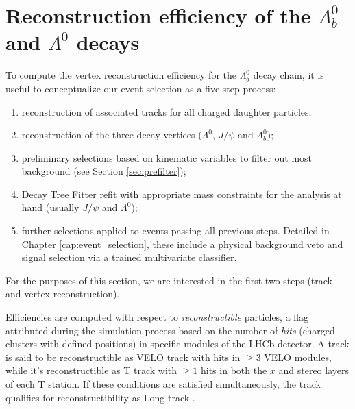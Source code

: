 
\section{Reconstruction efficiency of the \texorpdfstring{$\Lambda^0_b$}{Lambdab} and \texorpdfstring{$\Lambda^0$}{Lambda} decays}

To compute the vertex reconstruction efficiency for the $\Lambda_b^0$ decay chain, it is useful to conceptualize our event selection as a five step process:
\begin{enumerate}
	\item reconstruction of associated tracks for all charged daughter particles;
	\item reconstruction of the three decay vertices ($\Lambda^0$, $J/\psi$ and $\Lambda_b^0$);
	\item preliminary selections based on kinematic variables to filter out most background (see Section \ref{sec:prefilter});
	\item Decay Tree Fitter refit with appropriate mass constraints for the analysis at hand (usually $J/\psi$ and $\Lambda^0$);
	\item further selections applied to events passing all previous steps. Detailed in Chapter \ref{cap:event_selection}, these include a physical background veto and signal selection via a trained multivariate classifier.
\end{enumerate}

For the purposes of this section, we are interested in the first two steps (track and vertex reconstruction).

Efficiencies are computed with respect to \textit{reconstructible} particles, a flag attributed during the simulation process based on the number of \textit{hits} (charged clusters with defined positions) in specific modules of the LHCb detector.
A track is said to be reconstructible as VELO track with hits in $\geq 3$ VELO modules, while it's reconstructible as T track with $\geq 1$ hits in both the $x$ and stereo layers of each T station.
If these conditions are satisfied simultaneously, the track qualifies for reconstructibility as Long track \cite{Li:2752971}.

